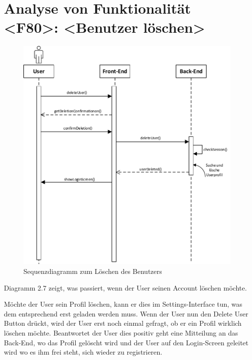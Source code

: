 \section{Analyse von Funktionalität <F80>: <Benutzer löschen>} 
\begin{figure}[h]
\centering
\includegraphics[width=1.3\textwidth]{figures/sequenz_F80.pdf}
\caption{Sequenzdiagramm zum Löschen des Benutzers}
\label{sequence}
\end{figure}
Diagramm 2.7 zeigt, was passiert, wenn der User seinen Account löschen möchte.

Möchte der User sein Profil löschen, kann er dies im Settings-Interface tun, was dem entsprechend erst geladen werden muss. Wenn der User nun den Delete User Button drückt, wird der User erst noch einmal gefragt, ob er ein Profil wirklich löschen möchte. Beantwortet der User dies positiv geht eine Mitteilung an das Back-End, wo das Profil gelöscht wird und der User auf den Login-Screen geleitet wird wo es ihm frei steht, sich wieder zu registrieren.

\newpage
